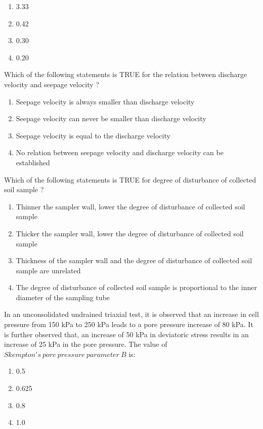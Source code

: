 \begin{enumerate}
    \item 3.33
    \item 0.42
    \item 0.30
    \item 0.20 \\
\end{enumerate}
\item Which of the following statements is TRUE for the relation between discharge velocity and seepage velocity ?
\begin{enumerate}
    \item Seepage velocity is always smaller than discharge velocity
    \item Seepage velocity can never be smaller than discharge velocity
    \item Seepage velocity is equal to the discharge velocity
    \item No relation between seepage velocity and discharge velocity can be established \\
\end{enumerate}
\item Which of the following statements is TRUE for degree of disturbance of collected soil sample ?
\begin{enumerate}
    \item Thinner the sampler wall, lower the degree of disturbance of collected soil sample
    \item Thicker the sampler wall, lower the degree of disturbance of collected soil sample
    \item Thickness of the sampler wall and the degree of disturbance of collected soil sample are unrelated
    \item The degree of disturbance of collected soil sample is proportional to the inner diameter of the sampling tube \\
\end{enumerate}
\item In an unconsolidated undrained triaxial test, it is observed that an increase in cell pressure from 150 kPa to 250 kPa leads to a pore pressure increase of 80 kPa. It is further observed that, an increase of 50 kPa in deviatoric stress results in an increase of 25 kPa in the pore pressure. The value of $Skempton's\ pore\ pressure\ parameter\ B$ is:
  \begin{enumerate}
   \item 0.5
   \item 0.625
   \item 0.8
   \item 1.0 \\
\end{enumerate}
